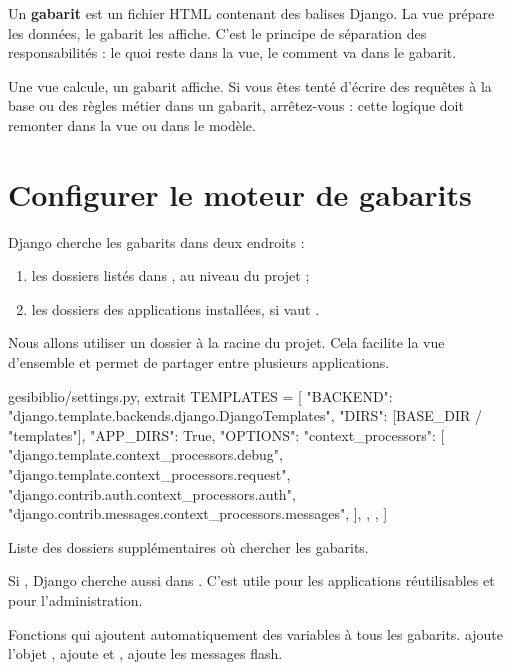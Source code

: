 Un \textbf{gabarit} est un fichier HTML contenant des balises Django. La vue
prépare les données, le gabarit les affiche. C'est le principe de séparation des
responsabilités : le \og quoi \fg{} reste dans la vue, le \og comment \fg{} va dans
le gabarit.

\begin{retenir}
Une vue calcule, un gabarit affiche. Si vous êtes tenté d'écrire des requêtes à la
base ou des règles métier dans un gabarit, arrêtez-vous : cette logique doit
remonter dans la vue ou dans le modèle.
\end{retenir}

\section{Configurer le moteur de gabarits}

Django cherche les gabarits dans deux endroits :
\begin{enumerate}
  \item les dossiers listés dans , au niveau du projet ;
  \item les dossiers  des applications installées, si
         vaut .
\end{enumerate}

Nous allons utiliser un dossier  à la racine du projet. Cela
facilite la vue d'ensemble et permet de partager  entre plusieurs
applications.

\begin{codebox}[python]{gesibiblio/settings.py, extrait}
TEMPLATES = [
    {
        "BACKEND": "django.template.backends.django.DjangoTemplates",
        "DIRS": [BASE_DIR / "templates"],
        "APP_DIRS": True,
        "OPTIONS": {
            "context_processors": [
                "django.template.context_processors.debug",
                "django.template.context_processors.request",
                "django.contrib.auth.context_processors.auth",
                "django.contrib.messages.context_processors.messages",
            ],
        },
    },
]
\end{codebox}

\begin{description}[leftmargin=3.6cm,style=nextline]
  \item[\code{DIRS}] Liste des dossiers supplémentaires où chercher les gabarits.
  \item[\code{APP\_DIRS}] Si , Django cherche aussi dans
  . C'est utile pour les applications réutilisables
  et pour l'administration.
  \item[\code{context\_processors}] Fonctions qui ajoutent automatiquement des
  variables à tous les gabarits.  ajoute l'objet ,
   ajoute  et ,  ajoute les
  messages flash.
\end{description}

